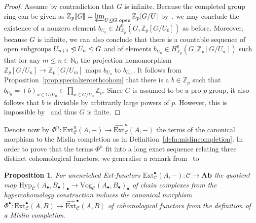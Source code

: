 \documentclass[12pt, a4paper]{article}
\numberwithin{equation}{section}
\newtheorem{prop}[thm]{Proposition}
\theoremstyle{empty}
\theoremstyle{nonumberplain}
\newtheorem{proof}{Proof}
\newcommand{\triangleleftneq}{%
  \mathrel{\ooalign{$\lneq$\cr\raise.22ex\hbox{$\lhd$}\cr}}}
\begin{document}
\begin{proof}
Assume by contradiction that $G$ is infinite. Because the completed group ring can be given as $\mathbb{Z}_p{\llbracket}G{\rrbracket} = \varprojlim_{U \trianglelefteq G \text{ open}} \mathbb{Z}_p[G/U]$ by~\cite[p.~171]{rib10}, we may conclude the existence of a nonzero element $b_{U_0} \in H_{\mathbb{Z}_p}^0(G, \mathbb{Z}_p[G/U_0])$ as before. Moreover, because $G$ is infinite, we can also conclude that there is a countable sequence of open subgroups $U_{n+1} \triangleleftneq U_n \trianglelefteq G$ and of elements $b_{U_n} \in H_{\mathbb{Z}_p}^0(G, \mathbb{Z}_p[G/U_n])$ such that for any $m \leq n \in \mathbb{N}_0$ the projection homomorphism $\mathbb{Z}_p[G/U_n] \rightarrow \mathbb{Z}_p[G/U_m]$ maps $b_{U_n}$ to $b_{U_m}$. It follows from Proposition~\ref{prop:specialzeroethcohom} that there is a $b \in \mathbb{Z}_p$ such that $b_{U_0} = (b)_{x \in G/U_0} \in \prod_{x \in G/U_0} \mathbb{Z}_p$. Since $G$ is assumed to be a pro-$p$ group, it also follows that $b$ is divisible by arbitrarily large powers of $p$. However, this is impossible by~\cite[p.~26--27]{wil98} and thus $G$ is finite.
\end{proof}

Denote now by $\Phi^n: \mathrm{Ext}_{\mathcal{C}}^n(A, -) \rightarrow \widehat{\mathrm{Ext}}_{\mathcal{C}}^n(A, -)$ the terms of the canonical morphism to the Mislin completion as in Definition~\ref{defn:mislincompletion}. In order to prove that the terms $\Phi^n$ fit into a long exact sequence relating three distinct cohomological functors, we generalise a remark from~\cite[p.~210]{kro95} to

\begin{prop}\label{prop:quotinducescan}
For unenriched Ext-functors $\mathrm{Ext}_{\mathcal{C}}^{\bullet}(A, -): \mathcal{C} \rightarrow \mathbf{Ab}$ the quotient map $\mathrm{Hyp}_{\mathcal{C}}(A_{\bullet}, B_{\bullet})_{\bullet} \rightarrow \mathrm{Vog}_{\mathcal{C}}(A_{\bullet}, B_{\bullet})_{\bullet}$ of chain complexes from the hypercohomology construction induces the canonical morphism $\Phi^{\bullet}: \mathrm{Ext}_{\mathcal{C}}^{\bullet}(A, B) \rightarrow \widehat{\mathrm{Ext}}_{\mathcal{C}}^{\bullet}(A, B)$ of cohomological functors from the definition of a Mislin completion.
\end{prop}
\end{document}
